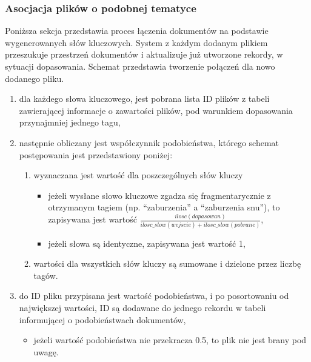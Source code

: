 \documentclass[12pt,a4paper,twoside]{article}
\begin{document}
\subsubsection*{Asocjacja plików o podobnej tematyce}
Poniższa sekcja przedstawia proces łączenia dokumentów na podstawie wygenerowanych słów kluczowych. System z każdym dodanym plikiem przeszukuje przestrzeń dokumentów i aktualizuje już utworzone rekordy, w sytuacji dopasowania. Schemat przedstawia tworzenie połączeń dla nowo dodanego pliku.
\begin{enumerate}
\item dla każdego słowa kluczowego, jest pobrana lista ID plików z tabeli zawierającej informacje o zawartości plików, pod warunkiem dopasowania przynajmniej jednego tagu,
\item następnie obliczany jest współczynnik podobieństwa, którego schemat postępowania jest przedstawiony poniżej:
	\begin{enumerate}
		\item wyznaczana jest wartość dla poszczególnych słów kluczy
		\begin{itemize}
			\item jeżeli wysłane słowo kluczowe zgadza się fragmentarycznie z otrzymanym tagiem (np. ``zaburzenia'' a ``zaburzenia snu''), to zapisywana jest wartość $\frac{ilosc(dopasowan)}{ilosc\_slow(wejscie)+ilosc\_slow(pobrane)}$,
			\item jeżeli słowa są identyczne, zapisywana jest wartość 1,
		\end{itemize}
		\item wartości dla wszystkich słów kluczy są sumowane i dzielone przez liczbę tagów.
	\end{enumerate}
\item do ID pliku przypisana jest wartość podobieństwa, i po posortowaniu od największej wartości, ID są dodawane do jednego rekordu w tabeli informującej o podobieństwach dokumentów,
	\begin{itemize}
		\item jeżeli wartość podobieństwa nie przekracza 0.5, to plik nie jest brany pod uwagę.
	\end{itemize}
\end{enumerate}
\newpage
\end{document}
